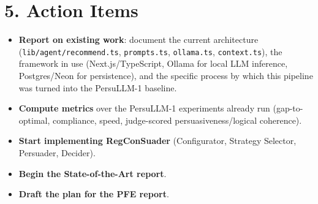 \documentclass[10pt]{article}
\begin{document}
\section*{5. Action Items}
\begin{itemize}[label=$\square$]
  \item \textbf{Report on existing work}: document the current architecture (\texttt{lib/agent/recommend.ts}, \texttt{prompts.ts}, \texttt{ollama.ts}, \texttt{context.ts}), the framework in use (Next.js/TypeScript, Ollama for local LLM inference, Postgres/Neon for persistence), and the specific process by which this pipeline was turned into the PersuLLM-1 baseline.
  \item \textbf{Compute metrics} over the PersuLLM-1 experiments already run (gap-to-optimal, compliance, speed, judge-scored persuasiveness/logical coherence).
  \item \textbf{Start implementing RegConSuader} (Configurator, Strategy Selector, Persuader, Decider).
  \item \textbf{Begin the State-of-the-Art report}.
  \item \textbf{Draft the plan for the PFE report}.
\end{itemize}
\end{document}
